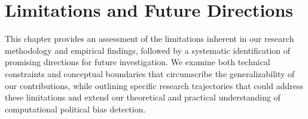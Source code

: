 \chapter{Limitations and Future Directions}
\label{sec:limitations-future-work}

This chapter provides an assessment of the limitations inherent in our research methodology and empirical findings, followed by a systematic identification of promising directions for future investigation. We examine both technical constraints and conceptual boundaries that circumscribe the generalizability of our contributions, while outlining specific research trajectories that could address these limitations and extend our theoretical and practical understanding of computational political bias detection.




